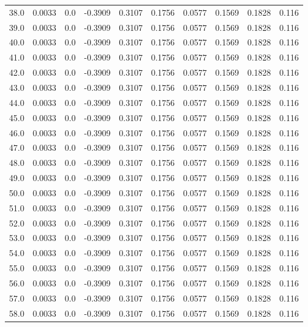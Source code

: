 \begin{longtable}{lrrrrrrrrr}
38.0 & 0.0033 & 0.0 & -0.3909 & 0.3107 & 0.1756 & 0.0577 & 0.1569 & 0.1828 & 0.116 \\
39.0 & 0.0033 & 0.0 & -0.3909 & 0.3107 & 0.1756 & 0.0577 & 0.1569 & 0.1828 & 0.116 \\
40.0 & 0.0033 & 0.0 & -0.3909 & 0.3107 & 0.1756 & 0.0577 & 0.1569 & 0.1828 & 0.116 \\
41.0 & 0.0033 & 0.0 & -0.3909 & 0.3107 & 0.1756 & 0.0577 & 0.1569 & 0.1828 & 0.116 \\
42.0 & 0.0033 & 0.0 & -0.3909 & 0.3107 & 0.1756 & 0.0577 & 0.1569 & 0.1828 & 0.116 \\
43.0 & 0.0033 & 0.0 & -0.3909 & 0.3107 & 0.1756 & 0.0577 & 0.1569 & 0.1828 & 0.116 \\
44.0 & 0.0033 & 0.0 & -0.3909 & 0.3107 & 0.1756 & 0.0577 & 0.1569 & 0.1828 & 0.116 \\
45.0 & 0.0033 & 0.0 & -0.3909 & 0.3107 & 0.1756 & 0.0577 & 0.1569 & 0.1828 & 0.116 \\
46.0 & 0.0033 & 0.0 & -0.3909 & 0.3107 & 0.1756 & 0.0577 & 0.1569 & 0.1828 & 0.116 \\
47.0 & 0.0033 & 0.0 & -0.3909 & 0.3107 & 0.1756 & 0.0577 & 0.1569 & 0.1828 & 0.116 \\
48.0 & 0.0033 & 0.0 & -0.3909 & 0.3107 & 0.1756 & 0.0577 & 0.1569 & 0.1828 & 0.116 \\
49.0 & 0.0033 & 0.0 & -0.3909 & 0.3107 & 0.1756 & 0.0577 & 0.1569 & 0.1828 & 0.116 \\
50.0 & 0.0033 & 0.0 & -0.3909 & 0.3107 & 0.1756 & 0.0577 & 0.1569 & 0.1828 & 0.116 \\
51.0 & 0.0033 & 0.0 & -0.3909 & 0.3107 & 0.1756 & 0.0577 & 0.1569 & 0.1828 & 0.116 \\
52.0 & 0.0033 & 0.0 & -0.3909 & 0.3107 & 0.1756 & 0.0577 & 0.1569 & 0.1828 & 0.116 \\
53.0 & 0.0033 & 0.0 & -0.3909 & 0.3107 & 0.1756 & 0.0577 & 0.1569 & 0.1828 & 0.116 \\
54.0 & 0.0033 & 0.0 & -0.3909 & 0.3107 & 0.1756 & 0.0577 & 0.1569 & 0.1828 & 0.116 \\
55.0 & 0.0033 & 0.0 & -0.3909 & 0.3107 & 0.1756 & 0.0577 & 0.1569 & 0.1828 & 0.116 \\
56.0 & 0.0033 & 0.0 & -0.3909 & 0.3107 & 0.1756 & 0.0577 & 0.1569 & 0.1828 & 0.116 \\
57.0 & 0.0033 & 0.0 & -0.3909 & 0.3107 & 0.1756 & 0.0577 & 0.1569 & 0.1828 & 0.116 \\
58.0 & 0.0033 & 0.0 & -0.3909 & 0.3107 & 0.1756 & 0.0577 & 0.1569 & 0.1828 & 0.116 \\

\end{longtable}
